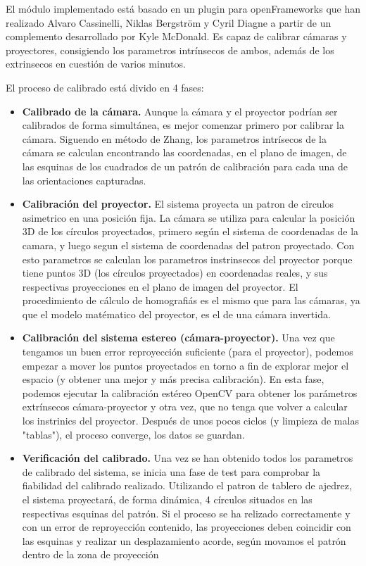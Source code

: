 El módulo implementado está basado en un plugin para openFrameworks que han realizado Alvaro Cassinelli, Niklas Bergström y Cyril Diagne a partir de un complemento desarrollado por Kyle McDonald. Es capaz de calibrar cámaras y proyectores, consigiendo los parametros intrínsecos de ambos, además de los extrinsecos en cuestión de varios minutos. 

El proceso de calibrado está divido en 4 fases:

\begin{itemize}
\item\textbf{Calibrado de la cámara. } Aunque la cámara y el proyector podrían ser calibrados de forma simultánea, es mejor comenzar primero por calibrar la cámara. Siguendo en método de Zhang, los parametros intrísecos de la cámara se calculan encontrando las coordenadas, en el plano de imagen, de las esquinas de los cuadrados de un patrón de calibración para cada una de las orientaciones capturadas.

\item\textbf{Calibración del proyector. } El sistema proyecta un patron de circulos asimetrico en una posición fija. La cámara se utiliza para calcular la posición 3D de los círculos proyectados, primero según el sistema de coordenadas de la camara, y luego segun el sistema de coordenadas del patron proyectado. Con esto parametros se calculan los parametros instrinsecos del proyector porque tiene puntos 3D (los círculos proyectados) en coordenadas reales, y sus respectivas proyecciones en el plano de imagen del proyector. El procedimiento de cálculo de homografiás es el mismo que para las cámaras, ya que el modelo matématico del proyector, es el de una cámara invertida. 

\item\textbf{Calibración del sistema estereo (cámara-proyector). } Una vez que tengamos un buen error reproyección suficiente (para el proyector), podemos empezar a mover los puntos proyectados en torno a fin de explorar mejor el espacio (y obtener una mejor y más precisa calibración). En esta fase, podemos ejecutar la calibración estéreo OpenCV para obtener los parámetros extrínsecos cámara-proyector y otra vez, que no tenga que volver a calcular los instrinics del proyector. Después de unos pocos ciclos (y limpieza de malas "tablas"), el proceso converge, los datos se guardan.

\item\textbf{Verificación del calibrado. } Una vez se han obtenido todos los parametros de calibrado del sistema, se inicia una fase de test para comprobar la fiabilidad del calibrado realizado. Utilizando el patron de tablero de ajedrez, el sistema proyectará, de forma dinámica, 4 círculos situados en las respectivas esquinas del patrón. Si el proceso se ha relizado correctamente y con un error de reproyección contenido, las proyecciones deben coincidir con las esquinas y realizar un desplazamiento acorde, según movamos el patrón dentro de la zona de proyección 
\end{itemize}

